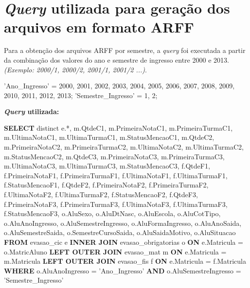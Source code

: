 
\chapter{\textit{Query} utilizada para geração dos arquivos em formato ARFF} \label{apendiceC}

Para a obtenção dos arquivos ARFF  por semestre, a \textit{query} foi executada a partir da combinação dos valores do ano e semestre de ingresso entre 2000 e 2013. \textit{(Exemplo: 2000/1, 2000/2, 2001/1, 2001/2 ...)}. 

'Ano\_Ingresso' = 2000, 2001, 2002, 2003, 2004, 2005, 2006, 2007, 2008, 2009, 2010, 2011, 2012, 2013;
'Semestre\_Ingresso' = 1, 2; 
\newline
\newline

\textbf{\textit{Query} utilizada:} 
\newline
\newline

\noindent \textbf{SELECT} distinct e.*, \newline
m.QtdeC1, m.PrimeiraNotaC1, m.PrimeiraTurmaC1, 
m.UltimaNotaC1, m.UltimaTurmaC1, m.StatusMencaoC1, \newline
m.QtdeC2, m.PrimeiraNotaC2, m.PrimeiraTurmaC2,
m.UltimaNotaC2, m.UltimaTurmaC2, m.StatusMencaoC2, \newline
m.QtdeC3, m.PrimeiraNotaC3, m.PrimeiraTurmaC3, 
m.UltimaNotaC3, m.UltimaTurmaC3, m.StatusMencaoC3, \newline
f.QtdeF1, f.PrimeiraNotaF1, f.PrimeiraTurmaF1,
f.UltimaNotaF1, f.UltimaTurmaF1, \newline 
f.StatusMencaoF1, \newline
f.QtdeF2, f.PrimeiraNotaF2, f.PrimeiraTurmaF2,
f.UltimaNotaF2, f.UltimaTurmaF2, \newline
f.StatusMencaoF2, \newline
f.QtdeF3, f.PrimeiraNotaF3, f.PrimeiraTurmaF3,
f.UltimaNotaF3, f.UltimaTurmaF3,\newline 
f.StatusMencaoF3, \newline
o.AluSexo, o.AluDtNasc, o.AluEscola, o.AluCotTipo, o.AluAnoIngresso,  \newline
o.AluSemestreIngresso, o.AluFormaIngresso, 
o.AluAnoSaida, o.AluSemestreSaida, \newline o.SemestreCursoSaida,
o.AluSaidaMotivo, o.AluSituacao \newline
\textbf{FROM} evasao\_cic e 
\textbf{INNER JOIN} evasao\_obrigatorias o \textbf{ON} e.Matricula = o.MatricAluno \newline
\textbf{LEFT OUTER JOIN} evasao\_mat m \textbf{ON} e.Matricula = m.Matricula \newline
\textbf{LEFT OUTER JOIN} evasao\_fis f \textbf{ON} e.Matricula = f.Matricula \newline
\textbf{WHERE} o.AluAnoIngresso = 'Ano\_Ingresso'  \newline \textbf{AND} o.AluSemestreIngresso = 'Semestre\_Ingresso'


